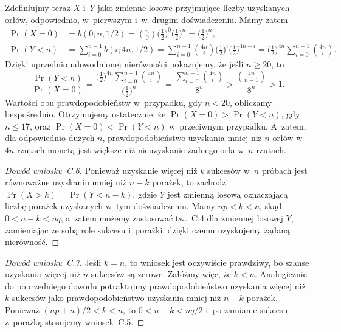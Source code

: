 Zdefiniujmy teraz $X$ i~$Y$ jako zmienne losowe przyjmujące liczby uzyskanych orłów, odpowiednio, w~pierwszym i~w~drugim doświadczeniu. Mamy zatem
\begin{align*}
	\Pr(X=0) &= b(0;n,1/2) = \binom{n}{0}\biggl(\frac{1}{2}\biggr)^0\biggl(\frac{1}{2}\biggr)^n = \biggl(\frac{1}{2}\biggr)^n, \\
	\Pr(Y<n) &= \sum_{i=0}^{n-1}b(i;4n,1/2) = \sum_{i=0}^{n-1}\binom{4n}{i}\biggl(\frac{1}{2}\biggr)^i\biggl(\frac{1}{2}\biggr)^{4n-i} = \biggl(\frac{1}{2}\biggr)^{4n}\sum_{i=0}^{n-1}\binom{4n}{i}.
\end{align*}
Dzięki uprzednio udowodnionej nierówności pokazujemy, że jeśli $n\ge20$, to
\[
    \frac{\Pr(Y<n)}{\Pr(X=0)} = \frac{\bigl(\frac{1}{2}\bigr)^{4n}\sum_{i=0}^{n-1}\binom{4n}{i}}{\bigl(\frac{1}{2}\bigr)^n} = \frac{\sum_{i=0}^{n-1}\binom{4n}{i}}{8^n} > \frac{\binom{4n}{n-1}}{8^n} > 1.
\]
Wartości obu prawdopodobieństw w~przypadku, gdy $n<20$, obliczamy bezpośrednio. Otrzymujemy ostatecznie, że $\Pr(X=0)>\Pr(Y<n)$, gdy $n\le17$, oraz $\Pr(X=0)<\Pr(Y<n)$ w~przeciwnym przypadku. A~zatem, dla odpowiednio dużych $n$, prawdopodobieństwo uzyskania mniej niż $n$ orłów w~$4n$ rzutach monetą jest większe niż nieuzyskanie żadnego orła w~$n$ rzutach.

\exercise %
\begin{proof}[Dowód wniosku~C.6]
	Ponieważ uzyskanie więcej niż $k$ sukcesów w~$n$ próbach jest równoważne uzyskaniu mniej niż $n-k$ porażek, to zachodzi $\Pr(X>k)=\Pr(Y<n-k)$, gdzie $Y$ jest zmienną losową oznaczającą liczbę porażek uzyskanych w~tym doświadczeniu. Mamy $np<k<n$, skąd $0<n-k<nq$, a~zatem możemy zastosować tw.~C.4 dla zmiennej losowej $Y$, zamieniając ze sobą role sukcesu i~porażki, dzięki czemu uzyskujemy żądaną nierówność.
\end{proof}

\begin{proof}[Dowód wniosku~C.7]
	Jeśli $k=n$, to wniosek jest oczywiście prawdziwy, bo szanse uzyskania więcej niż $n$ sukcesów są zerowe. Załóżmy więc, że $k<n$. Analogicznie do poprzedniego dowodu potraktujmy prawdopodobieństwo uzyskania więcej niż $k$ sukcesów jako prawdopodobieństwo uzyskania mniej niż $n-k$ porażek. Ponieważ $(np+n)/2<k<n$, to $0<n-k<nq/2$ i~po zamianie sukcesu z~porażką stosujemy wniosek~C.5.
\end{proof}

\exercise %

